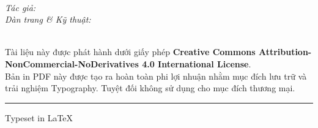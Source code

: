 \thispagestyle{empty}
\vspace*{\fill}

\begin{flushleft}
    \textbf{\MakeUppercase{\booktitle}}\\
    \textit{Tác giả:} \bookauthor \\
    \textit{Dàn trang \& Kỹ thuật:} \booktypesetter

    \vspace{1cm}

    \ccbyncnd \\[0.2cm]
    {\footnotesize
    Tài liệu này được phát hành dưới giấy phép \textbf{Creative Commons Attribution-NonCommercial-NoDerivatives 4.0 International License}.\\
    Bản in PDF này được tạo ra hoàn toàn phi lợi nhuận nhằm mục đích lưu trữ và trải nghiệm Typography. Tuyệt đối không sử dụng cho mục đích thương mại.
    }

    \vspace{0.5cm}
    \textcolor{theme_secondary}{\rule{\textwidth}{0.5pt}} %
    \vspace{0.2cm}

    {\scriptsize Typeset in \LaTeX\ \textbullet\ \the\year\ \textbullet\ \textbf{\editionname}}
\end{flushleft}
\clearpage